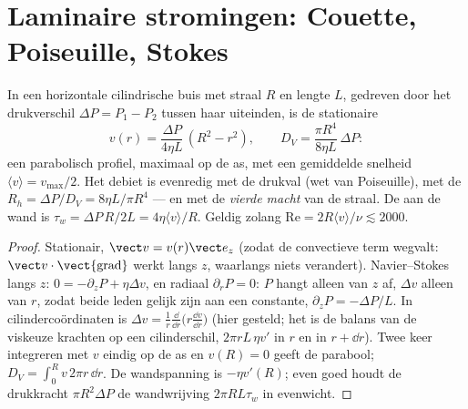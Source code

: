 \section{Laminaire stromingen: Couette, Poiseuille, Stokes}

\begin{proposition}\label{prop:b2:viscous-flows:poiseuille}
In een horizontale cilindrische buis met straal $R$ en lengte $L$, gedreven
door het drukverschil $\Delta P = P_1 - P_2$ tussen haar uiteinden, is de
stationaire 
\[
v(r) = \frac{\Delta P}{4\eta L}\,(R^2 - r^2) , \qquad
D_V = \frac{\pi R^4}{8\eta L}\,\Delta P :
\]
een parabolisch profiel, maximaal op de as, met een gemiddelde snelheid
$\langle v\rangle = v_{\max}/2$. Het debiet is evenredig met de drukval (wet
van Poiseuille), met de \emph{}
$R_h = \Delta P/D_V = 8\eta L/\pi R^4$ --- en met de \emph{vierde macht} van
de straal. De  aan de wand is
$\tau_w = \Delta P\,R/2L = 4\eta\langle v
\rangle/R$. Geldig zolang
$\mathrm{Re} = 2R\langle v\rangle/\nu \lesssim 2000$.
\end{proposition}

\begin{proof}
Stationair, $\vect v = v(r)\vect e_z$ (zodat de convectieve term wegvalt:
$\vect v
\cdot\operatorname{\vect{grad}}$ werkt langs $z$, waarlangs niets
verandert). Navier--Stokes langs $z$: $0 = -\partial_zP + \eta\Delta v$, en
radiaal $\partial_rP = 0$: $P$ hangt alleen van $z$ af, $\Delta v$ alleen
van $r$, zodat beide leden gelijk zijn aan een constante,
$\partial_zP = -\Delta P/L$. In cilindercoördinaten is
$\Delta v = \frac1r\frac{\dd}{\dd r}\bigl(r\frac{\dd v}{\dd r}\bigr)$ (hier
gesteld; het is de balans van de viskeuze krachten op een cilinderschil,
$2\pi rL\,\eta v'$ in $r$ en in $r + \dd r$). Twee keer integreren met $v$
eindig op de as en $v(R) = 0$ geeft de parabool;
$D_V = \int_0^Rv\,2\pi
r\,\dd r$. De wandspanning is $-\eta v'(R)$; even
goed houdt de drukkracht $\pi R^2\Delta P$ de wandwrijving $2\pi RL\tau_w$
in evenwicht.
\end{proof}


